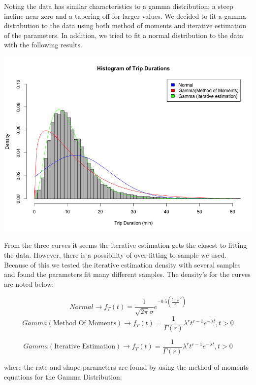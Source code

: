 \documentclass{article}
\numberwithin{equation}{section}
\begin{document}
Noting the data has similar characteristics to a gamma distribution: a steep incline near zero and a tapering off for larger values. We decided to fit a gamma distribution to the data using both method of moments and iterative estimation of the parameters. In addition, we tried to fit a normal distribution to the data with the following results. 

\includegraphics[scale=0.5]{normal_vs_gamma(mm)_gamma(iterative).png}

From the three curves it seems the iterative estimation gets the closest to fitting the data. However, there is a possibility of over-fitting to sample we used. Because of this we tested the iterative estimation density with several samples and found the parameters fit many different samples. The density's for the curves are noted below:

\begin{equation}
    Normal \rightarrow  f_T(t) = \frac{1}{\sqrt{2\pi} \sigma}e^{-0.5(\frac{t-\mu}{\sigma}^2)}
\end{equation}
\begin{equation}
    Gamma (\text{Method Of Moments}) \rightarrow f_T(t) = \frac{1}{\Gamma(r)} \lambda^r t^{r-1}e^{-\lambda t}, t > 0
\end{equation}

\begin{equation}
    Gamma (\text{Iterative Estimation}) \rightarrow f_T(t) = \frac{1}{\Gamma(r)} \lambda^r t^{r-1}e^{-\lambda t}, t > 0
\end{equation}

where the rate and shape parameters are found by using the method of moments equations for the Gamma Distribution: 
\end{document}
